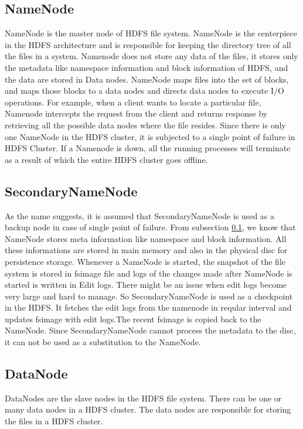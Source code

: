\documentclass[11pt,a4paper,bibtotoc,idxtotoc,headsepline,footsepline,footexclude,BCOR12mm,DIV13]{scrbook}
\begin{document}
\subsection{NameNode}
\label{NameNode}
NameNode is the master node of HDFS file system. NameNode is the centerpiece in the HDFS architecture and is responsible for keeping the directory tree of all the files in a system\cite{HDFS:namenodeanddatanode}. Namenode does not store any data of the files, it stores 
only the metadata like namespace information and block information of HDFS\cite{HDFS:namenodeanddatanode}, and the data are stored in Data nodes. NameNode maps files into the set of blocks, and maps those blocks to a data nodes and directs data nodes to execute I/O operations\cite{HDFS:namenodeanddatanode}. For example, when a client wants to locate a particular file, Namenode intercepts the request from the client and returns response by retrieving all the possible data nodes where the file resides. Since there is only one NameNode in the HDFS cluster, it is subjected to a single point of failure in HDFS Cluster. If a Namenode is down, all the running processes will terminate as a result of which the entire HDFS cluster goes offline\cite{HDFS:namenodeanddatanode}.  

\subsection{SecondaryNameNode}
\label{SecondaryNameNode}
As the name suggests, it is assumed that SecondaryNameNode is used as a backup node in case of single point of failure. From subsection \ref{NameNode}, we know that NameNode stores meta information like namespace and block information. All these informations are stored in main memory and also in the physical disc for persistence storage\cite{HDFS:secondarynamenode}. Whenever a NameNode is started, the snapshot of the file system is stored in fsimage file and logs of the changes made after NameNode is started is written in Edit logs. There might be an issue when edit logs become very large and hard to manage. So SecondaryNameNode is used as a checkpoint in the HDFS. It fetches the edit logs from the namenode in reqular interval and updates fsimage with edit logs.The recent fsimage is copied back to the NameNode\cite{HDFS:secondarynamenode}. Since SecondaryNameNode cannot process the metadata to the disc\cite{HDFS:architecture}, it can not be used as a substitution to the NameNode.

\subsection{DataNode}
\label{DataNode}
DataNodes are the slave nodes in the HDFS file system. There can be one or many data nodes in a HDFS cluster. The data nodes are responsible for storing the files in a HDFS cluster. 
\end{document}
